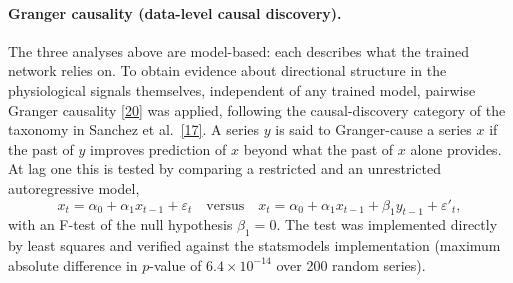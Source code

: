 %
%



\paragraph{Granger causality (data-level causal discovery).} The three analyses above are model-based: each describes what the trained network relies on. To obtain evidence about directional structure in the physiological signals themselves, independent of any trained model, pairwise Granger causality \hyperlink{ref20}{[20]} was applied, following the causal-discovery category of the taxonomy in Sanchez et al.\ \hyperlink{ref17}{[17]}. A series $y$ is said to Granger-cause a series $x$ if the past of $y$ improves prediction of $x$ beyond what the past of $x$ alone provides. At lag one this is tested by comparing a restricted and an unrestricted autoregressive model,
\[
x_t = \alpha_0 + \alpha_1 x_{t-1} + \varepsilon_t
\quad\text{versus}\quad
x_t = \alpha_0 + \alpha_1 x_{t-1} + \beta_1 y_{t-1} + \varepsilon'_t ,
\]
with an F-test of the null hypothesis $\beta_1 = 0$. The test was implemented directly by least squares and verified against the statsmodels implementation (maximum absolute difference in $p$-value of $6.4\times10^{-14}$ over 200 random series).

